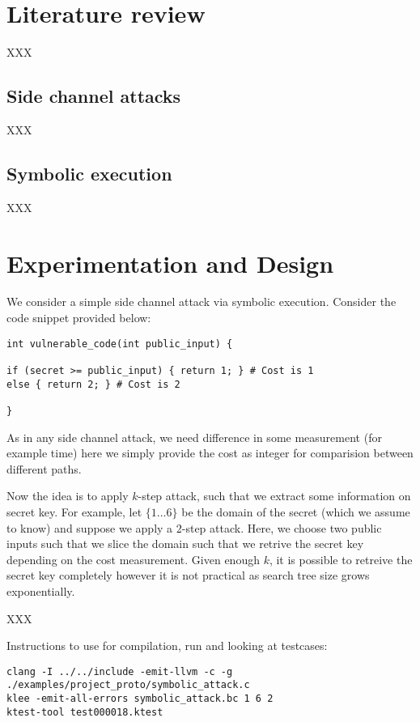 \documentclass[11pt,a4paper,notitlepage]{article}
\begin{document}
\newpage

\section{Literature review}
\label{cha:literaturereview}

XXX

\subsection{Side channel attacks}
\label{sec:sidechannelattacks}

XXX 

\subsection{Symbolic execution}
\label{sec:symbolicexecution}

XXX

\newpage

\section{Experimentation and Design}

We consider a simple side channel attack via symbolic execution.
Consider the code snippet provided below:
\begin{verbatim}
int vulnerable_code(int public_input) {

if (secret >= public_input) { return 1; } # Cost is 1
else { return 2; } # Cost is 2

}
\end{verbatim}

As in any side channel attack, we need difference in some measurement (for example time) here we simply provide the cost as integer
for comparision between different paths.

Now the idea is to apply $k$-step attack, such that we extract some information on secret key.
For example, let $\{1 \dots 6\}$ be the domain of the secret (which we assume to know) and suppose we apply a $2$-step attack.
Here, we choose two public inputs such that we slice the domain such that we retrive the secret key depending on the cost measurement.
Given enough $k$, it is possible to retreive the secret key completely however it is not practical as search tree size grows exponentially.

XXX

Instructions to use for compilation, run and looking at testcases:
\begin{verbatim}
clang -I ../../include -emit-llvm -c -g ./examples/project_proto/symbolic_attack.c
klee -emit-all-errors symbolic_attack.bc 1 6 2
ktest-tool test000018.ktest
\end{verbatim}

\newpage




\end{document}
